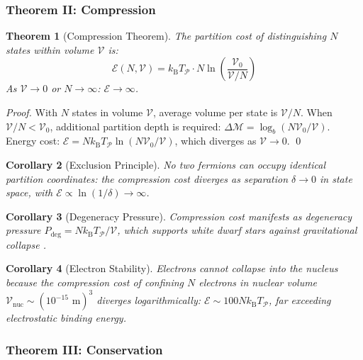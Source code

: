 \documentclass[twocolumn,10pt,a4paper]{article}
\newtheorem{theorem}{Theorem}[section]
\newtheorem{corollary}[theorem]{Corollary}
\theoremstyle{definition}
\theoremstyle{remark}
\newcommand{\kB}{k_{\mathrm{B}}}
\newcommand{\Depth}{\mathcal{M}}
\newcommand{\Cost}{\mathcal{E}}
\newcommand{\Partition}{\mathcal{P}}
\begin{document}
\subsubsection{Theorem II: Compression}

\begin{theorem}[Compression Theorem]
\label{thm:compression}
The partition cost of distinguishing $N$ states within volume $\mathcal{V}$ is:
\begin{equation}
    \Cost(N, \mathcal{V}) = \kB T_{\Partition} \cdot N \ln\left(\frac{\mathcal{V}_0}{\mathcal{V}/N}\right)
\end{equation}
As $\mathcal{V} \to 0$ or $N \to \infty$: $\Cost \to \infty$.
\end{theorem}

\begin{proof}
With $N$ states in volume $\mathcal{V}$, average volume per state is $\mathcal{V}/N$. When $\mathcal{V}/N < \mathcal{V}_0$, additional partition depth is required: $\Delta\Depth = \log_b(N\mathcal{V}_0/\mathcal{V})$. Energy cost: $\Cost = N \kB T_{\Partition} \ln(N\mathcal{V}_0/\mathcal{V})$, which diverges as $\mathcal{V} \to 0$. \qed
\end{proof}

\begin{corollary}[Exclusion Principle]
\label{cor:exclusion}
No two fermions can occupy identical partition coordinates: the compression cost diverges as separation $\delta \to 0$ in state space, with $\Cost \propto \ln(1/\delta) \to \infty$.
\end{corollary}

\begin{corollary}[Degeneracy Pressure]
\label{cor:degeneracy}
Compression cost manifests as degeneracy pressure $P_{\text{deg}} = N\kB T_{\Partition}/\mathcal{V}$, which supports white dwarf stars against gravitational collapse \citep{chandrasekhar1931,fowler1926}.
\end{corollary}

\begin{corollary}[Electron Stability]
\label{cor:electron-stability}
Electrons cannot collapse into the nucleus because the compression cost of confining $N$ electrons in nuclear volume $\mathcal{V}_{\text{nuc}} \sim (10^{-15}\text{ m})^3$ diverges logarithmically: $\Cost \sim 100 N\kB T_{\Partition}$, far exceeding electrostatic binding energy.
\end{corollary}

\subsubsection{Theorem III: Conservation}
\end{document}
